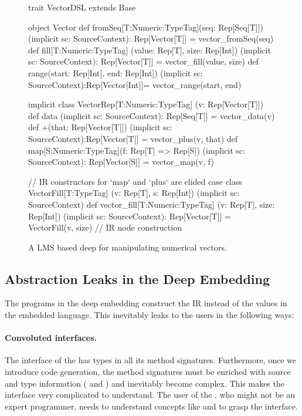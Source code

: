 \begin{figure}
\begin{listingtiny}
trait VectorDSL extends Base {
  object Vector {
    def fromSeq[T:Numeric:TypeTag](seq: Rep[Seq[T]])
      (implicit sc: SourceContext): Rep[Vector[T]] =
      vector_fromSeq(seq)
    def fill[T:Numeric:TypeTag]
      (value: Rep[T], size: Rep[Int])
      (implicit sc: SourceContext): Rep[Vector[T]] =
      vector_fill(value, size)
    def range(start: Rep[Int], end: Rep[Int])
      (implicit sc: SourceContext):Rep[Vector[Int]]=
      vector_range(start, end)
  }

  implicit class VectorRep[T:Numeric:TypeTag]
    (v: Rep[Vector[T]]) {
    def data
      (implicit sc: SourceContext): Rep[Seq[T]] =
      vector_data(v)
    def +(that: Rep[Vector[T]])
      (implicit sc: SourceContext):Rep[Vector[T]] =
      vector_plus(v, that)
    def map[S:Numeric:TypeTag](f: Rep[T] => Rep[S])
      (implicit sc: SourceContext): Rep[Vector[S]] =
      vector_map(v, f)
  }

  // IR constructors for `map` and `plus` are elided
  case class VectorFill[T:TypeTag]
    (v: Rep[T], s: Rep[Int])
    (implicit sc: SourceContext)
  def vector_fill[T:Numeric:TypeTag]
    (v: Rep[T], size: Rep[Int])
    (implicit sc: SourceContext): Rep[Vector[T]] =
    VectorFill(v, size) // IR node construction
}
\end{listingtiny}
\caption{\label{lst:vector_deep} A LMS based deep \edsl{} for manipulating numerical vectors.}
\end{figure}

\subsection{Abstraction Leaks in the Deep Embedding}
\label{sec:abstraction-leaks}

The programs in the deep embedding construct the IR instead of the values in the embedded language. This inevitably leaks to the users in the following ways:

\paragraph{Convoluted interfaces.} The interface of the \edsl has 
types in all its method signatures. Furthermore, once we introduce code
generation, the method signatures must be enriched with source and type
information ( and ) and inevitably become
complex. This makes the interface very complicated to understand. The user of
the \edsl{}, who might not be an expert programmer, needs to understand concepts
like  and  to grasp the interface.

